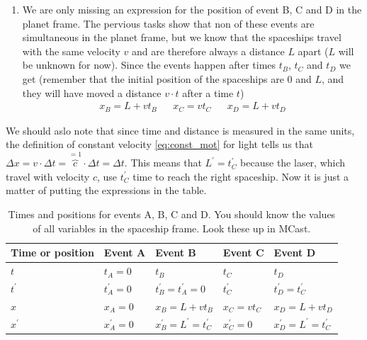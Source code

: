 \documentclass[a4paper,10pt,english]{article}
\begin{document}
\begin{enumerate}
\begin{enumerate}
\item We are only missing an expression for the position of event B, C and D in the planet frame. The pervious tasks show that non of these events are simultaneous in the planet frame, but we know that the spaceships travel with the same velocity $v$ and are therefore always a distance $L$ apart ($L$ will be unknown for now). Since the events happen after times $t_{B}$, $t_{C}$ and $t_{D}$ we get (remember that the initial position of the spaceships are $0$ and $L$, and they will have moved a distance $v\cdot t$ after a time $t$) 
\begin{align*}
x_{B}=L+vt_{B} && x_{C}=vt_{C} && x_{D}=L+vt_{D}
\end{align*}
\end{enumerate} %
We should aslo note that since time and distance is measured in the same units, the definition of constant velocity \ref{eq:const_mot} for light tells us that $\Delta x=v\cdot\Delta t=\overbrace{c}^{=1}\cdot\Delta t=\Delta t$. This means that $L^{\prime}=t_{C}^{\prime}$ because the laser, which travel with velocity $c$, use $t_{C}^{\prime}$ time to reach the right spaceship. Now it is just a matter of putting the expressions in the table.

\begin{table}[H]
  \begin{center}
    \begin{tabular}{| l | l | l | l | l |}
   	\hline
	 Time or position & Event A & Event B & Event C & Event D\\ \hline
	 $t$ & $t_{A}=0$ & $t_{B}$ & $t_{C}$ & $t_{D}$\\ \hline
	 $t^{\prime}$ & $t^{\prime}_{A}=0$ & $t_{B}^{\prime}=t^{\prime}_{A}=0$ & $t_{C}^{\prime}$ & $t^{\prime}_{D}=t^{\prime}_{C}$\\ \hline
	 $x$ & $x_{A}=0$ & $x_{B}=L+vt_{B}$ & $x_{C}=vt_{C}$ & $x_{D}=L+vt_{D}$\\ \hline
	 $x^{\prime}$ & $x^{\prime}_{A}=0$ & $x_{B}^{\prime}=L^{\prime}=t_{C}^{\prime}$ & $x_{C}^{\prime}=0$ & $x^{\prime}_{D}=L^{\prime}=t_{C}^{\prime}$\\ \hline
	\end{tabular}
    \caption{Times and positions for events A, B, C and D. You should know the values of all variables in the spaceship frame. Look these up in MCast.}
    \label{tabel:ex_2A_4}
  \end{center}
\end{table}
\FloatBarrier



\end{enumerate}
\end{document}
